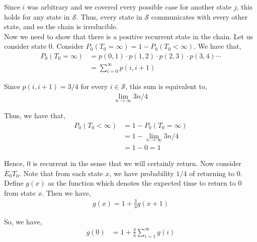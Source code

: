 \documentclass[12pt]{article}
\begin{document}
Since $i$ was arbitrary and we covered every possible case for another state $j$, this holds for any state in $\mathcal{S}$. Thus, every state in $\mathcal{S}$ communicates with every other state, and so the chain is irreducible.\\

Now we need to show that there is a positive recurrent state in the chain. Let us consider state $0$. Consider $P_0(T_0 = \infty) = 1 - P_0(T_0 < \infty)$. We have that,
\begin{align*}
P_0(T_0 = \infty) &= p(0, 1) \cdot p(1, 2) \cdot p(2, 3) \cdot p(3, 4) \cdots\\
&= \sum_{i=0}^{\infty} p(i, i+1)
\end{align*}

Since $p(i, i+1) = 3/4$ for every $i \in \mathcal{S}$, this sum is equivalent to,
\begin{align*}
\lim_{n \to \infty} 3n/4
\end{align*}

Thus, we have that,
\begin{align*}
P_0(T_0 < \infty) &= 1 - P_0(T_0 = \infty)\\
&= 1 - \lim_{n \to \infty} 3n/4\\
&= 1 - 0 = 1
\end{align*}

Hence, $0$ is recurrent in the sense that we will certainly return. Now consider $E_0T_0$. Note that from each state $x$, we have probability $1/4$ of returning to $0$. Define $g(x)$ as the function which denotes the expected time to return to $0$ from state $x$. Then we have,
\begin{align*}
g(x) = 1 + \frac{3}{4}g(x+1)
\end{align*}

So, we have,
\begin{align*}
g(0) &= 1 + \frac{3}{4} \sum_{i = 1}^{\infty}g(i)
\end{align*}
\end{document}
